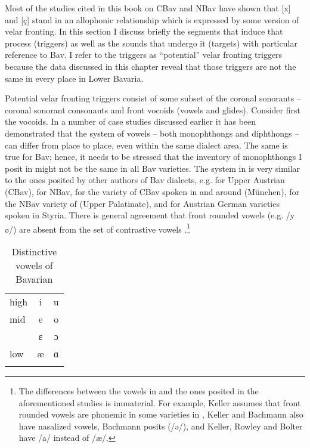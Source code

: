 Most of the studies cited in this book on CBav and NBav have shown that [x] and [ç] stand in an allophonic relationship which is expressed by some version of velar fronting. In this section I discuss briefly the segments that induce that process (triggers) as well as the sounds that undergo it (targets) with particular reference to Bav. I refer to the triggers as “potential” velar fronting triggers because the data discussed in this chapter reveal that those triggers are not the same in every place in Lower Bavaria.

Potential velar fronting triggers consist of some subset of the coronal sonorants -- coronal sonorant consonants and front vocoids (vowels and glides). Consider first the vocoids. In a number of case studies discussed earlier it has been demonstrated that the system of vowels -- both monophthongs and diphthongs -- can differ from place to place, even within the same dialect area. The same is true for Bav; hence, it needs to be stressed that the inventory of monophthongs I posit in  might not be the same in all Bav varieties. The system in  is very similar to the ones posited by other authors of Bav dialects, e.g. \citet[207]{Keller1963} for Upper Austrian (CBav), \citet[422]{Rowley1989} for NBav, \citet[485--486]{Wiesinger1989} for the variety of CBav spoken in and around  (München), \citet[17]{Bachmann2000} for the NBav variety of  (Upper Palatinate), and \citet{Bolter2021} for Austrian German varieties spoken in Styria. There is general agreement that front rounded vowels (e.g. /y ø/) are absent from the set of contrastive vowels \citep[452]{Wiesinger1989}.\footnote{The differences between the vowels in  and the ones posited in the aforementioned studies is immaterial. For example, Keller assumes that front rounded vowels are phonemic in some varieties in , Keller and Bachmann also have nasalized vowels, Bachmann posits  (/ə/), and Keller, Rowley and Bolter have /a/ instead of /æ/.}

\begin{table}
\caption{\label{tab:fromex:13:1}Distinctive vowels of Bavarian}
\begin{tabular}{lcc}
\lsptoprule
high & i & u \\
mid & e & o\\
    & ɛ & ɔ\\
low & æ & ɑ\\
\lspbottomrule
\end{tabular}
\end{table}

